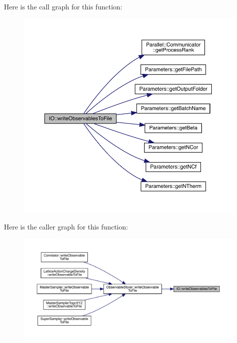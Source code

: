 Here is the call graph for this function\+:\nopagebreak
\begin{figure}[H]
\begin{center}
\leavevmode
\includegraphics[width=350pt]{namespace_i_o_ad8cf5aef8f60d10b80292b69a091d5ac_cgraph}
\end{center}
\end{figure}
Here is the caller graph for this function\+:\nopagebreak
\begin{figure}[H]
\begin{center}
\leavevmode
\includegraphics[width=350pt]{namespace_i_o_ad8cf5aef8f60d10b80292b69a091d5ac_icgraph}
\end{center}
\end{figure}

